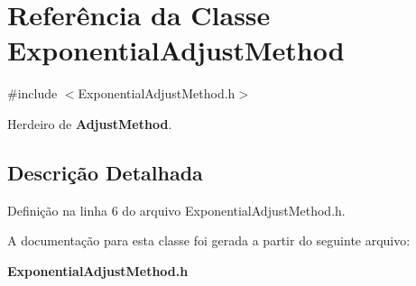 \section{Referência da Classe Exponential\+Adjust\+Method}
\label{class_exponential_adjust_method}


{\ttfamily \#include $<$Exponential\+Adjust\+Method.\+h$>$}



Herdeiro de {\bf Adjust\+Method}.



\subsection{Descrição Detalhada}


Definição na linha 6 do arquivo Exponential\+Adjust\+Method.\+h.



A documentação para esta classe foi gerada a partir do seguinte arquivo\+:\begin{DoxyCompactItemize}
\item 
{\bf Exponential\+Adjust\+Method.\+h}\end{DoxyCompactItemize}
